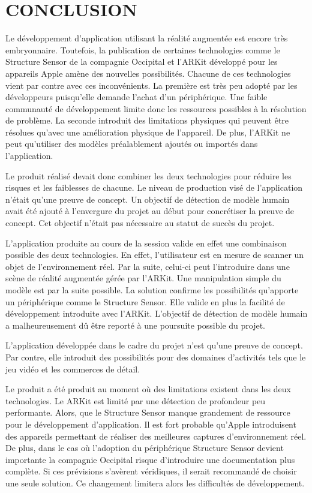 \documentclass[rapport.tex]{subfiles}
\begin{document}
\chapter*{\uppercase{CONCLUSION}}
Le développement d’application utilisant la réalité augmentée est encore très embryonnaire. Toutefois, la publication de certaines technologies comme le Structure Sensor de la compagnie Occipital et l’ARKit développé pour les appareils Apple amène des nouvelles possibilités. Chacune de ces technologies vient par contre avec ces inconvénients. La première est très peu adopté par les développeurs puisqu’elle demande l’achat d’un périphérique. Une faible communauté de développement limite donc les ressources possibles à la résolution de problème. La seconde introduit des limitations physiques qui peuvent être résolues qu’avec une amélioration physique de l’appareil. De plus, l’ARKit ne peut qu'utiliser des modèles préalablement ajoutés ou importés dans l’application.
\par
Le produit réalisé devait donc combiner les deux technologies pour réduire les risques et les faiblesses de chacune. Le niveau de production visé de l’application n'était qu’une preuve de concept. Un objectif de détection de modèle humain avait été ajouté à l’envergure du projet au début pour concrétiser la preuve de concept. Cet objectif n’était pas nécessaire au statut de succès du projet.
\par
L'application produite au cours de la session valide en effet une combinaison possible des deux technologies. En effet, l’utilisateur est en mesure de scanner un objet de l’environnement réel. Par la suite, celui-ci peut l’introduire dans une scène de réalité augmentée gérée par l’ARKit. Une manipulation simple du modèle est par la suite possible. La solution confirme les possibilités qu’apporte un périphérique comme le Structure Sensor. Elle valide en plus la facilité de développement introduite avec l’ARKit. L’objectif de détection de modèle humain a malheureusement dû être reporté à une poursuite possible du projet.
\par
L’application développée dans le cadre du projet n’est qu’une preuve de concept. Par contre, elle introduit des possibilités pour des domaines d’activités tels que le jeu vidéo et les commerces de détail.
\par
Le produit a été produit au moment où des limitations existent dans les deux technologies. Le ARKit est limité par une détection de profondeur peu performante. Alors, que le Structure Sensor manque grandement de ressource pour le développement d’application. Il est fort probable qu’Apple introduisent des appareils permettant de réaliser des meilleures captures d’environnement réel. De plus, dans le cas où l’adoption du périphérique Structure Sensor devient importante la compagnie Occipital risque d’introduire une documentation plus complète. Si ces prévisions s’avèrent véridiques, il serait recommandé de choisir une seule solution. Ce changement limitera alors les difficultés de développement.
\end{document}
